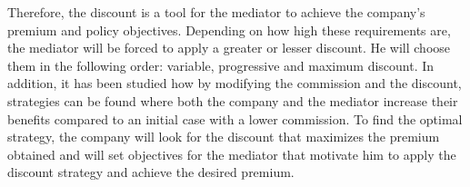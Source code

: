 \documentclass[review]{elsarticle}
\begin{document}
Therefore, the discount is a tool for the mediator to achieve the company's premium and policy objectives. Depending on how high these requirements are, the mediator will be forced to apply a greater or lesser discount. He will choose them in the following order: variable, progressive and maximum discount. In addition, it has been studied how by modifying the commission and the discount, strategies can be found where both the company and the mediator increase their benefits compared to an initial case with a lower commission.
To find the optimal strategy, the company will look for the discount that maximizes the premium obtained and will set objectives for the mediator that motivate him to apply the discount strategy and achieve the desired premium.

\end{document}
